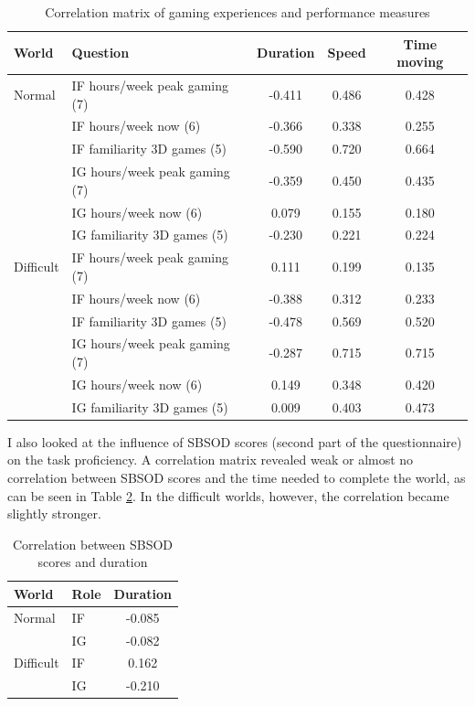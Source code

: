 \begin{table}[!htbp]
 \centering
\begin{tabular}{llccc}
\toprule
World & Question  & Duration & Speed & Time moving  \\
\midrule
Normal 	& IF hours/week peak gaming (7) 	& -0.411 &	0.486 &	0.428\\
 		& IF hours/week now 	(6)			& -0.366	 & 	0.338 &	0.255\\
 		& IF familiarity 3D games (5)	& -0.590	 &	0.720 &	0.664\\
 		& IG hours/week peak gaming (7) 	& -0.359 &	0.450 &	0.435\\
 		& IG hours/week now 	(6)			& 0.079	 &	0.155 &	0.180\\
 		& IG familiarity 3D games (5)	& -0.230 &	0.221 &	0.224\\
\midrule
Difficult& IF hours/week peak gaming (7) & 0.111 &	0.199 &	0.135\\
 		& IF hours/week now (6)			& -0.388 &	0.312 &	0.233\\
 		& IF familiarity 3D games (5)	& -0.478 &	0.569 &	0.520\\
 		& IG hours/week peak gaming (7) 	& -0.287 &	0.715 &	0.715\\
 		& IG hours/week now (6)			& 0.149 &	0.348 &	0.420\\
 		& IG familiarity 3D games (5)	& 0.009 &	0.403 &	0.473\\
\bottomrule
\end{tabular}
\caption{Correlation matrix of gaming experiences and performance measures}
\label{tab:demfactors-gaming}
\end{table}

I also looked at the influence of SBSOD scores (second part of the questionnaire) on the task proficiency. A correlation matrix revealed weak or almost no correlation between SBSOD scores and the time needed to complete the world, as can be seen in Table \ref{tab:demfactors-sbsod}. In the difficult worlds, however, the correlation became slightly stronger.

\begin{table}[!htbp]
 \centering
\begin{tabular}{llc}
\toprule
 World & Role   & Duration \\
\midrule
Normal & IF &	-0.085\\
 & IG &	-0.082\\
\midrule
Difficult & IF & 0.162\\
 & IG &	-0.210\\
\bottomrule
\end{tabular}
\caption{Correlation between SBSOD scores and duration}
\label{tab:demfactors-sbsod}
\end{table}

